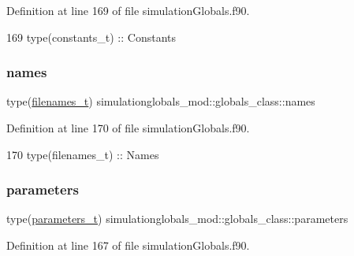 Definition at line 169 of file simulation\+Globals.\+f90.


\begin{DoxyCode}
169         \textcolor{keywordtype}{type}(constants\_t)   :: Constants
\end{DoxyCode}
\mbox{\label{structsimulationglobals__mod_1_1globals__class_a9bd11f32980290cab3bc86db344dc28a}} 
\subsubsection{\texorpdfstring{names}{names}}
{\footnotesize\ttfamily type(\mbox{\hyperlink{structsimulationglobals__mod_1_1filenames__t}{filenames\+\_\+t}}) simulationglobals\+\_\+mod\+::globals\+\_\+class\+::names\hspace{0.3cm}{\ttfamily [private]}}



Definition at line 170 of file simulation\+Globals.\+f90.


\begin{DoxyCode}
170         \textcolor{keywordtype}{type}(filenames\_t)   :: Names
\end{DoxyCode}
\mbox{\label{structsimulationglobals__mod_1_1globals__class_a6cf7f7fdf4c9f17c57bed07fea62be6a}} 
\subsubsection{\texorpdfstring{parameters}{parameters}}
{\footnotesize\ttfamily type(\mbox{\hyperlink{structsimulationglobals__mod_1_1parameters__t}{parameters\+\_\+t}}) simulationglobals\+\_\+mod\+::globals\+\_\+class\+::parameters\hspace{0.3cm}{\ttfamily [private]}}



Definition at line 167 of file simulation\+Globals.\+f90.


